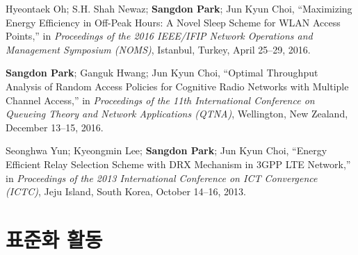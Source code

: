 \documentclass[11pt,a4paper]{article}
\begin{document}
\begin{enumerate}[label={[{\arabic*}]}, leftmargin=*, itemsep=0.3em]
\item Hyeontaek Oh; S.H. Shah Newaz; \textbf{Sangdon Park}; Jun Kyun Choi, ``Maximizing Energy Efficiency in Off-Peak Hours: A Novel Sleep Scheme for WLAN Access Points,'' in \textit{Proceedings of the 2016 IEEE/IFIP Network Operations and Management Symposium (NOMS)}, Istanbul, Turkey, April 25--29, 2016.

\item \textbf{Sangdon Park}; Ganguk Hwang; Jun Kyun Choi, ``Optimal Throughput Analysis of Random Access Policies for Cognitive Radio Networks with Multiple Channel Access,'' in \textit{Proceedings of the 11th International Conference on Queueing Theory and Network Applications (QTNA)}, Wellington, New Zealand, December 13--15, 2016.

\item Seonghwa Yun; Kyeongmin Lee; \textbf{Sangdon Park}; Jun Kyun Choi, ``Energy Efficient Relay Selection Scheme with DRX Mechanism in 3GPP LTE Network,'' in \textit{Proceedings of the 2013 International Conference on ICT Convergence (ICTC)}, Jeju Island, South Korea, October 14--16, 2013.
\end{enumerate}

\section{표준화 활동}
\end{document}
